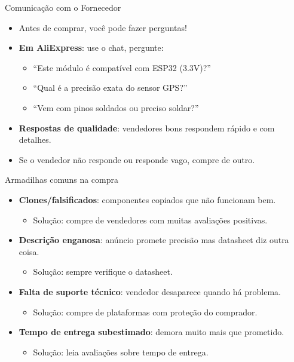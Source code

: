 \documentclass[10pt]{beamer}
\begin{document}
\begin{frame}{Comunicação com o Fornecedor}
  \begin{itemize}
    \item Antes de comprar, você pode fazer perguntas!
    \item \textbf{Em AliExpress}: use o chat, pergunte:
    \begin{itemize}
      \item ``Este módulo é compatível com ESP32 (3.3V)?''
      \item ``Qual é a precisão exata do sensor GPS?''
      \item ``Vem com pinos soldados ou preciso soldar?''
    \end{itemize}
    \item \textbf{Respostas de qualidade}: vendedores bons respondem rápido e com detalhes.
    \item Se o vendedor não responde ou responde vago, compre de outro.
  \end{itemize}
\end{frame}

\begin{frame}{Armadilhas comuns na compra}
  \begin{itemize}
    \item \textbf{Clones/falsificados}: componentes copiados que não funcionam bem.
    \begin{itemize}
      \item Solução: compre de vendedores com muitas avaliações positivas.
    \end{itemize}
    \item \textbf{Descrição enganosa}: anúncio promete precisão mas datasheet diz outra coisa.
    \begin{itemize}
      \item Solução: sempre verifique o datasheet.
    \end{itemize}
    \item \textbf{Falta de suporte técnico}: vendedor desaparece quando há problema.
    \begin{itemize}
      \item Solução: compre de plataformas com proteção do comprador.
    \end{itemize}
    \item \textbf{Tempo de entrega subestimado}: demora muito mais que prometido.
    \begin{itemize}
      \item Solução: leia avaliações sobre tempo de entrega.
    \end{itemize}
  \end{itemize}
\end{frame}
\end{document}
